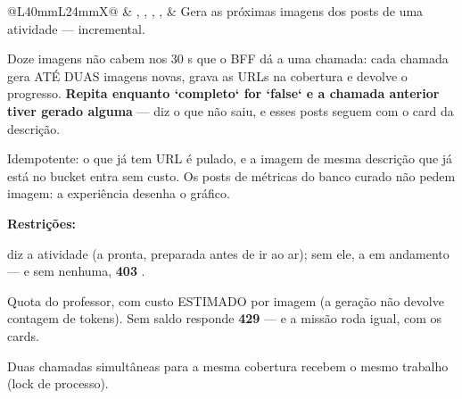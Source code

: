 \begin{tabularx}{\linewidth}{@{}L{40mm}L{24mm}X@{}}
 & , , , ,  & Gera as próximas imagens dos posts de uma atividade --- incremental.\par Doze imagens não cabem nos 30 s que o BFF dá a uma chamada: cada chamada gera ATÉ DUAS imagens novas, grava as URLs na cobertura e devolve o progresso. \textbf{Repita enquanto `completo` for `false` e a chamada anterior tiver gerado alguma} ---  diz o que não saiu, e esses posts seguem com o card da descrição.\par Idempotente: o que já tem URL é pulado, e a imagem de mesma descrição que já está no bucket entra sem custo. Os posts de métricas do banco curado não pedem imagem: a experiência desenha o gráfico.\par \textbf{Restrições:}\par \hspace*{1em}\textbullet{}  diz a atividade (a pronta, preparada antes de ir ao ar); sem ele, a em andamento --- e sem nenhuma, \textbf{403} .\par \hspace*{1em}\textbullet{} Quota do professor, com custo ESTIMADO por imagem (a geração não devolve contagem de tokens). Sem saldo responde \textbf{429}  --- e a missão roda igual, com os cards.\par \hspace*{1em}\textbullet{} Duas chamadas simultâneas para a mesma cobertura recebem o mesmo trabalho (lock de processo).\\

\end{tabularx}
